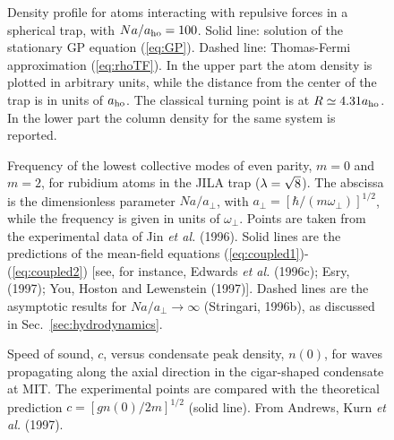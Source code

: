 \bigskip

\begin{figure}[t]
\epsfysize=10cm
\hspace{3cm}
\caption{Density profile for atoms interacting with repulsive 
forces in a spherical trap, with $Na/a_{\rm ho}=100$. Solid line: 
solution of the stationary GP equation (\protect\ref{eq:GP}). 
Dashed line: Thomas-Fermi approximation (\protect\ref{eq:rhoTF}).
In the upper part the atom density is plotted in arbitrary units,
while the distance from the center of the trap is in units of 
$a_{\rm ho}$. The classical turning point is at $R \simeq 4.31 a_{\rm ho}$. 
In the lower part the column density for the same system is 
reported.  } 
\label{fig:tf-column}
\end{figure}

\bigskip

\begin{figure}[t]
\epsfysize=8cm
\hspace{3cm}
\caption{Frequency of the lowest collective modes of even parity,
$m=0$ and $m=2$, for rubidium atoms in the JILA trap ($\lambda=
\protect\sqrt{8}$). The abscissa is the dimensionless parameter 
$Na/a_{\perp}$, with $a_\perp=[ \hbar / (m \omega_\perp)]^{1/2}$, 
while the frequency is given in units of $\omega_\perp$.  Points are 
taken from  the experimental data of Jin {\it et al.} (1996). Solid 
lines  are the predictions of the mean-field equations 
(\protect\ref{eq:coupled1})-(\protect\ref{eq:coupled2}) [see, for
instance, Edwards {\it et al.} (1996c); Esry, (1997); You, Hoston
and Lewenstein (1997)]. Dashed lines are the asymptotic results 
for $ Na/a_{\perp} \to \infty $ (Stringari, 1996b), as discussed in 
Sec.~\protect\ref{sec:hydrodynamics}.  } 
\label{fig:m0m2}
\end{figure}

\bigskip

\begin{figure}[t]
\epsfysize=8cm
\hspace{3cm}
\caption{Speed of sound, $c$, versus condensate peak density, $n(0)$, 
for waves propagating along the axial direction in the cigar-shaped
condensate at MIT. The experimental points are compared with the 
theoretical prediction $c=[g n(0)/ 2m]^{1/2}$ (solid line). From 
Andrews, Kurn {\it et al.} (1997).  } 
\label{fig:sound}
\end{figure}

\bigskip

